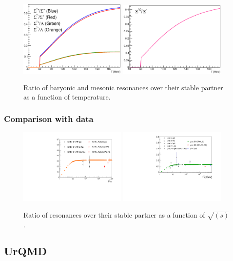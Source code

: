 \begin{figure}[!htbp]
\begin{center}
		\includegraphics[width=200px]{./Version1/FigChapter2/SigmaStarRatio}
		\includegraphics[width=200px]{./Version1/FigChapter2/XiStarToXi}
		\caption{\label{result1} Ratio of baryonic and mesonic resonances over their stable partner as a function of temperature.}
	\end{center}\hspace{2pc}%
\end{figure}

\newpage

\subsubsection{Comparison with data}

\begin{figure}[!htbp]
\begin{center}
	\includegraphics[width=200px]{./Version1/FigChapter2/Kstar_sqrt_s.pdf}
	\includegraphics[width=200px]{./Version1/FigChapter2/RhoToPion_sqrt_s.pdf}
	\caption{\label{result2} Ratio of resonances over their stable partner as a function of $\sqrt{(s)}$.}
\end{center}\hspace{2pc}%
\end{figure}



\subsection{UrQMD}

\newpage